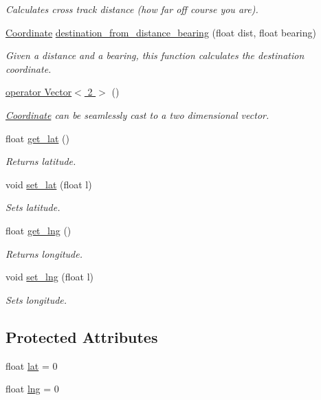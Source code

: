 \begin{DoxyCompactItemize}
\begin{DoxyCompactList}\small\item\em Calculates cross track distance (how far off course you are). \end{DoxyCompactList}\item 
\hyperlink{classetk_1_1_coordinate}{Coordinate} \hyperlink{classetk_1_1_coordinate_a11c15abf41756430aff34d666d8d13da}{destination\-\_\-from\-\_\-distance\-\_\-bearing} (float dist, float bearing)
\begin{DoxyCompactList}\small\item\em Given a distance and a bearing, this function calculates the destination coordinate. \end{DoxyCompactList}\item 
\hyperlink{classetk_1_1_coordinate_af0e3972f8bf38253cf2b40c79ac51300}{operator Vector$<$ 2 $>$} ()
\begin{DoxyCompactList}\small\item\em \hyperlink{classetk_1_1_coordinate}{Coordinate} can be seamlessly cast to a two dimensional vector. \end{DoxyCompactList}\item 
float \hyperlink{classetk_1_1_coordinate_afc991b2d2ba9e61e28c6784530f5b6ec}{get\-\_\-lat} ()
\begin{DoxyCompactList}\small\item\em Returns latitude. \end{DoxyCompactList}\item 
void \hyperlink{classetk_1_1_coordinate_aa9d7b6dbfdb4da3b788b88896edb6354}{set\-\_\-lat} (float l)
\begin{DoxyCompactList}\small\item\em Sets latitude. \end{DoxyCompactList}\item 
float \hyperlink{classetk_1_1_coordinate_ad59acdadf6fa7c597885f2248706c559}{get\-\_\-lng} ()
\begin{DoxyCompactList}\small\item\em Returns longitude. \end{DoxyCompactList}\item 
void \hyperlink{classetk_1_1_coordinate_a19d3ce4dab1e00903c0b609b4cf29fa2}{set\-\_\-lng} (float l)
\begin{DoxyCompactList}\small\item\em Sets longitude. \end{DoxyCompactList}\end{DoxyCompactItemize}
\subsection*{Protected Attributes}
\begin{DoxyCompactItemize}
\item 
float \hyperlink{classetk_1_1_coordinate_af261adfd9bac16c80b17046726d20c28}{lat} = 0
\item 
float \hyperlink{classetk_1_1_coordinate_a87145d8d5f3fb09f0cfc9e0d085aeda7}{lng} = 0
\end{DoxyCompactItemize}


